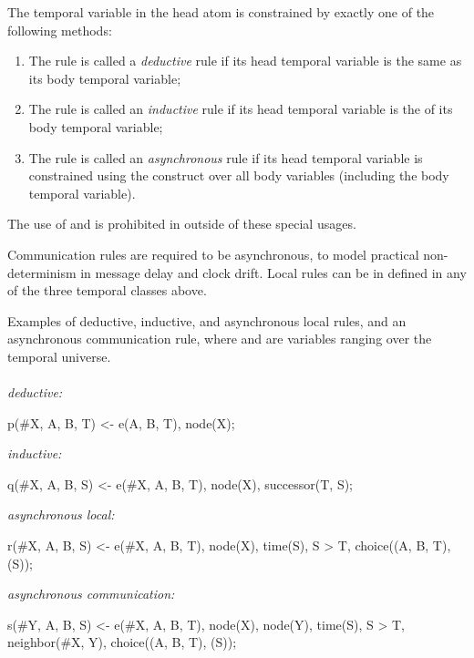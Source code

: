 The temporal variable in the head atom is constrained by exactly one of the following methods:
\begin{enumerate}
\item The rule is called a {\em deductive} rule if its head temporal variable is the same as its body temporal variable;
\item The rule is called an {\em inductive} rule if its head temporal variable is the  of its body temporal variable;
\item The rule is called an {\em asynchronous} rule if its head temporal variable is constrained using the  construct over all body variables (including the body temporal variable).
\end{enumerate}
The use of  and  is prohibited in \lang outside of these special usages.

Communication rules are required to be asynchronous, to model practical non-determinism in message delay and clock drift.  Local rules can be in defined in any of the three temporal classes above.

\begin{example}
\label{ex:nonsugared}
Examples of deductive, inductive, and asynchronous local rules, and an asynchronous communication rule, where  and  are variables ranging over the temporal universe.
\\\\
\textit{deductive:}\\
\begin{Dedalus}
p(#X, A, B, T) <- e(A, B, T), node(X);
\end{Dedalus}
\textit{inductive:}\\
\begin{Dedalus}
q(#X, A, B, S) <- e(#X, A, B, T), node(X),
                  successor(T, S);
\end{Dedalus}
\textit{asynchronous local:}\\
\begin{Dedalus}
r(#X, A, B, S) <- e(#X, A, B, T), node(X), time(S),
                  S > T, choice((A, B, T), (S));
\end{Dedalus}
\textit{asynchronous communication:}\\
\begin{Dedalus}
s(#Y, A, B, S) <- e(#X, A, B, T), node(X), node(Y),
                  time(S), S > T, neighbor(#X, Y),
                  choice((A, B, T), (S));
\end{Dedalus}
\end{example}


